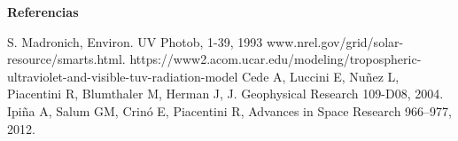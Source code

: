 \documentclass{article}
\begin{document}
\hspace{1cm}\vspace{0.5cm}
\begin{minipage}{0.35\linewidth}
\begin{center}
\begin{shaded}
\textbf{\textcolor{ver}{Referencias}}
\end{shaded}
\end{center}
\changefontsizes{10pt}
\begin{enumerate}
 S. Madronich, Environ. UV Photob, 1-39, 1993
 www.nrel.gov/grid/solar-resource/smarts.html.
 https://www2.acom.ucar.edu/modeling/tropospheric-ultraviolet-and-visible-tuv-radiation-model
 Cede A, Luccini E, Nuñez L, Piacentini R, Blumthaler M, Herman J, J.
Geophysical Research 109-D08, 2004.
 Ipiña A, Salum GM, Crinó E, Piacentini R, Advances in Space
Research 966–977, 2012.
\end{enumerate}
\end{minipage}
\end{document}
